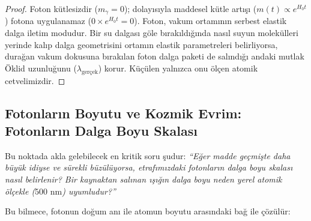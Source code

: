 \documentclass[11pt,a4paper]{article}
\begin{document}
\begin{proof}
    Foton kütlesizdir ($m_\gamma = 0$); dolayısıyla maddesel kütle artışı ($m(t) \propto e^{H_0 t}$) fotona uygulanamaz ($0 \times e^{H_0 t} = 0$). Foton, vakum ortamının serbest elastik dalga iletim modudur. Bir su dalgası göle bırakıldığında nasıl suyun molekülleri yerinde kalıp dalga geometrisini ortamın elastik parametreleri belirliyorsa, durağan vakum dokusuna bırakılan foton dalga paketi de salındığı andaki mutlak Öklid uzunluğunu ($\lambda_{\text{gerçek}}$) korur. Küçülen yalnızca onu ölçen atomik cetvelimizdir.
\end{proof}

\subsection{Fotonların Boyutu ve Kozmik Evrim: Fotonların Dalga Boyu Skalası}
\label{sec:fotonlar_neden_devasa_degil_em}

Bu noktada akla gelebilecek en kritik soru şudur: \textit{``Eğer madde geçmişte daha büyük idiyse ve sürekli büzülüyorsa, etrafımızdaki fotonların dalga boyu skalası nasıl belirlenir? Bir kaynaktan salınan ışığın dalga boyu neden yerel atomik ölçekle ($500\text{ nm}$) uyumludur?''}

Bu bilmece, fotonun doğum anı ile atomun boyutu arasındaki bağ ile çözülür:
\end{document}

